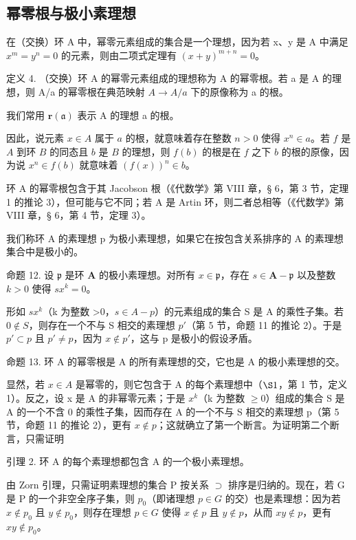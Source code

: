 \subsection{幂零根与极小素理想}

在（交换）环 A 中，幂零元素组成的集合是一个理想，因为若 x、y 是 A 中满足 \(x^{m} = y^{n} = 0\) 的元素，则由二项式定理有 \((x + y)^{m+n} = 0\)。

定义 4. （交换）环 A 的幂零元素组成的理想称为 A 的幂零根。若 a 是 A 的理想，则 A/a 的幂零根在典范映射 \(A \rightarrow A/a\) 下的原像称为 a 的根。

我们常用 \(\mathbf{r}(\mathfrak{a})\) 表示 A 的理想 a 的根。

因此，说元素 \(x \in A\) 属于 \(a\) 的根，就意味着存在整数 \(n > 0\) 使得 \(x^n \in a\)。若 \(f\) 是 \(A\) 到环 \(B\) 的同态且 \(b\) 是 \(B\) 的理想，则 \(f(b)\) 的根是在 \(f\) 之下 \(b\) 的根的原像，因为说 \(x^n \in f(b)\) 就意味着 \((f(x))^n \in b\)。

环 A 的幂零根包含于其 Jacobson 根（《代数学》第 VIII 章，§ 6，第 3 节，定理 1 的推论 3），但可能与它不同；若 A 是 Artin 环，则二者总相等（《代数学》第 VIII 章，§ 6，第 4 节，定理 3）。

我们称环 A 的素理想 p 为极小素理想，如果它在按包含关系排序的 A 的素理想集合中是极小的。

命题 12. 设 \(\mathfrak{p}\) 是环 \(\mathbf{A}\) 的极小素理想。对所有 \(x \in \mathfrak{p}\)，存在 \(s \in \mathbf{A} - \mathfrak{p}\) 以及整数 \(k > 0\) 使得 \(sx^k = 0\)。

形如 \(sx^{k}\)（k 为整数 \textgreater0，\(s \in A - p\)）的元素组成的集合 S 是 A 的乘性子集。若 \(0 \notin S\)，则存在一个不与 S 相交的素理想 \(p'\)（第 5 节，命题 11 的推论 2）。于是 \(p' \subset p\) 且 \(p' \neq p\)，因为 \(x \notin p'\)，这与 p 是极小的假设矛盾。

命题 13. 环 A 的幂零根是 A 的所有素理想的交，它也是 A 的极小素理想的交。

显然，若 \(x \in A\) 是幂零的，则它包含于 A 的每个素理想中（\(\S 1\)，第 1 节，定义 1）。反之，设 x 是 A 的非幂零元素；于是 \(x^{k}\)（k 为整数 \(\geqslant 0\)）组成的集合 S 是 A 的一个不含 0 的乘性子集，因而存在 A 的一个不与 S 相交的素理想 p（第 5 节，命题 11 的推论 2），更有 \(x \notin p\)；这就确立了第一个断言。为证明第二个断言，只需证明

引理 2. 环 A 的每个素理想都包含 A 的一个极小素理想。

由 Zorn 引理，只需证明素理想的集合 P 按关系 \(\supset\) 排序是归纳的。现在，若 G 是 P 的一个非空全序子集，则 \(p_{0}\)（即诸理想 \(p \in G\) 的交）也是素理想：因为若 \(x \notin p_{0}\) 且 \(y \notin p_{0}\)，则存在理想 \(p \in G\) 使得 \(x \notin p\) 且 \(y \notin p\)，从而 \(xy \notin p\)，更有 \(xy \notin p_{0}\)。

